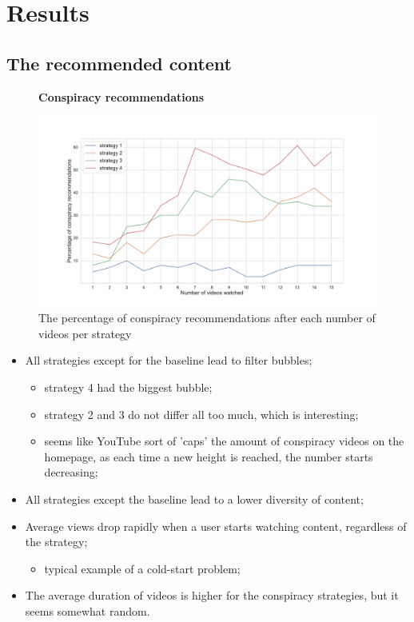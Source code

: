 \documentclass[../main.tex]{subfiles}
\begin{document}
\section{Results}



\subsection{The recommended content}

\begin{figure}[ht]
  \textbf{Conspiracy recommendations}\par\medskip
  \centering
  \includegraphics[keepaspectratio, width=\textwidth]{images/conspiracy_recs.pdf}
  \caption{The percentage of conspiracy recommendations after each number of videos per strategy}
  \label{fig:con_recs}
\end{figure}

\begin{itemize}
    \item All strategies except for the baseline lead to filter bubbles;
    \begin{itemize}
        \item strategy 4 had the biggest bubble;
        \item strategy 2 and 3 do not differ all too much, which is interesting;
        \item seems like YouTube sort of 'caps' the amount of conspiracy videos on the homepage, as each time a new height is reached, the number starts decreasing;
    \end{itemize}
    \item All strategies except the baseline lead to a lower diversity of content;
    \item Average views drop rapidly when a user starts watching content, regardless of the strategy;
    \begin{itemize}
        \item typical example of a cold-start problem;
    \end{itemize}
    \item The average duration of videos is higher for the conspiracy strategies, but it seems somewhat random.
    
\end{itemize}
\end{document}
